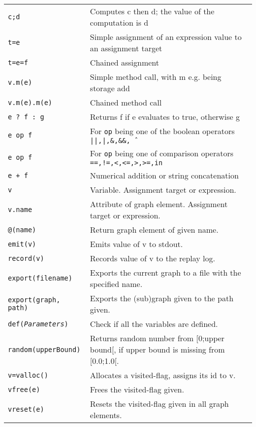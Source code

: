 \begin{table}[htbp]
\begin{minipage}{\linewidth} \renewcommand{\footnoterule}{} 
\begin{tabularx}{\linewidth}{|lX|}
\hline
\texttt{c;d}	& Computes c then d; the value of the computation is d\\
\texttt{t=e}	& Simple assignment of an expression value to an assignment target\\
\texttt{t=e=f}	& Chained assignment \\
\texttt{v.m(e)}	& Simple method call, with m e.g. being storage add \\
\texttt{v.m(e).m(e)}	& Chained method call\\
\hline
\texttt{e ? f : g}	& Returns f if e evaluates to true, otherwise g \\
\texttt{e op f}	& For \texttt{op} being one of the boolean operators \texttt{||,|,\&,\&\&,\^\ } \\
\texttt{e op f}	& For \texttt{op} being one of comparison operators \texttt{==,!=,<,<=,>,>=,in} \\
\texttt{e + f}	& Numerical addition or string concatenation \\
\hline
\texttt{v} & Variable. Assignment target or expression.\\
\texttt{v.name} & Attribute of graph element. Assignment target or expression.\\
\texttt{@(name)} & Return graph element of given name.\\
\texttt{emit(v)} & Emits value of v to stdout.\\
\texttt{record(v)} & Records value of v to the replay log.\\
\texttt{export(filename)} & Exports the current graph to a file with the specified name. \\
\texttt{export(graph, path)} & Exports the (sub)graph given to the path given.\\
\texttt{def(\emph{Parameters})} & Check if all the variables are defined.\\
\texttt{random(upperBound)} & Returns random number from [0;upper bound[, if upper bound is missing from [0.0;1.0[.\\
\hline
\texttt{v=valloc()} & Allocates a visited-flag, assigns its id to v.\\
\texttt{vfree(e)} & Frees the visited-flag given.\\
\texttt{vreset(e)} & Resets the visited-flag given in all graph elements.\\

\end{tabularx}
\end{minipage}
\end{table}
